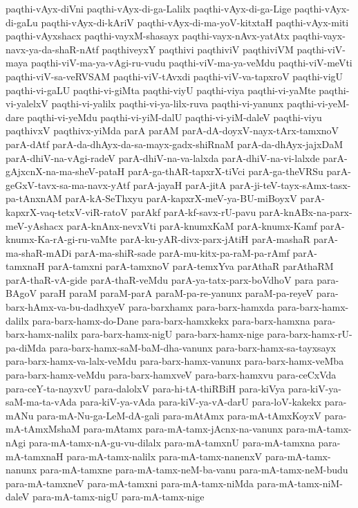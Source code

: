 {paqthi-vAyx-diVni
paqthi-vAyx-di-ga-Lalilx
paqthi-vAyx-di-ga-Lige
paqthi-vAyx-di-gaLu
paqthi-vAyx-di-kAriV
paqthi-vAyx-di-ma-yoV-kitxtaH
paqthi-vAyx-miti
paqthi-vAyxshacx
paqthi-vayxM-shasayx
paqthi-vayx-nAvx-yatAtx
paqthi-vayx-navx-ya-da-shaR-nAtf
paqthiveyxY
paqthivi
paqthiviV
paqthiviVM
paqthi-viV-maya
paqthi-viV-ma-ya-vAgi-ru-vudu
paqthi-viV-ma-ya-veMdu
paqthi-viV-meVti
paqthi-viV-sa-veRVSAM
paqthi-viV-tAvxdi
paqthi-viV-va-tapxroV
paqthi-vigU
paqthi-vi-gaLU
paqthi-vi-giMta
paqthi-viyU
paqthi-viya
paqthi-vi-yaMte
paqthi-vi-yalelxV
paqthi-vi-yalilx
paqthi-vi-ya-lilx-ruva
paqthi-vi-yanunx
paqthi-vi-yeM-dare
paqthi-vi-yeMdu
paqthi-vi-yiM-dalU
paqthi-vi-yiM-daleV
paqthi-viyu
paqthivxV
paqthivx-yiMda
parA
parAM
parA-dA-doyxV-nayx-tArx-tamxnoV
parA-dAtf
parA-da-dhAyx-da-sa-mayx-gadx-shiRnaM
parA-da-dhAyx-jajxDaM
parA-dhiV-na-vAgi-radeV
parA-dhiV-na-va-lalxda
parA-dhiV-na-vi-lalxde
parA-gAjxcnX-na-ma-sheV-pataH
parA-ga-thAR-tapxrX-tiVci
parA-ga-theVRSu
parA-geGxV-tavx-sa-ma-navx-yAtf
parA-jayaH
parA-jitA
parA-ji-teV-tayx-sAmx-tasx-pa-tAnxnAM
parA-kA-SeThxyu
parA-kapxrX-meV-ya-BU-miBoyxV
parA-kapxrX-vaq-tetxV-viR-ratoV
parAkf
parA-kf-savx-rU-pavu
parA-knABx-na-parx-meV-yAshacx
parA-knAnx-nevxVti
parA-knumxKaM
parA-knumx-Kamf
parA-knumx-Ka-rA-gi-ru-vaMte
parA-ku-yAR-divx-parx-jAtiH
parA-mashaR
parA-ma-shaR-mADi
parA-ma-shiR-sade
parA-mu-kitx-pa-raM-pa-rAmf
parA-tamxnaH
parA-tamxni
parA-tamxnoV
parA-temxYva
parAthaR
parAthaRM
parA-thaR-vA-gide
parA-thaR-veMdu
parA-ya-tatx-parx-boVdhoV
para
para-BAgoV
paraH
paraM
paraM-parA
paraM-pa-re-yanunx
paraM-pa-reyeV
para-barx-hAmx-va-bu-dadhxyeV
para-barxhamx
para-barx-hamxda
para-barx-hamx-dalilx
para-barx-hamx-do-Dane
para-barx-hamxkekx
para-barx-hamxna
para-barx-hamx-nalilx
para-barx-hamx-nigU
para-barx-hamx-nige
para-barx-hamx-rU-pa-diMda
para-barx-hamx-saM-baM-dha-vanunx
para-barx-hamx-sa-tayxsayx
para-barx-hamx-va-lalx-veMdu
para-barx-hamx-vanunx
para-barx-hamx-veMba
para-barx-hamx-veMdu
para-barx-hamxveV
para-barx-hamxvu
para-ceCxVda
para-ceY-ta-nayxvU
para-dalolxV
para-hi-tA-thiRBiH
para-kiVya
para-kiV-ya-saM-ma-ta-vAda
para-kiV-ya-vAda
para-kiV-ya-vA-darU
para-loV-kakekx
para-mANu
para-mA-Nu-ga-LeM-dA-gali
para-mAtAmx
para-mA-tAmxKoyxV
para-mA-tAmxMshaM
para-mAtamx
para-mA-tamx-jAcnx-na-vanunx
para-mA-tamx-nAgi
para-mA-tamx-nA-gu-vu-dilalx
para-mA-tamxnU
para-mA-tamxna
para-mA-tamxnaH
para-mA-tamx-nalilx
para-mA-tamx-nanenxV
para-mA-tamx-nanunx
para-mA-tamxne
para-mA-tamx-neM-ba-vanu
para-mA-tamx-neM-budu
para-mA-tamxneV
para-mA-tamxni
para-mA-tamx-niMda
para-mA-tamx-niM-daleV
para-mA-tamx-nigU
para-mA-tamx-nige
}
